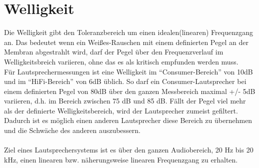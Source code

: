 \section{Welligkeit} \label{sec:8.6}
Die Welligkeit gibt den Toleranzbereich um einen idealen(linearen) Frequenzgang an.
Das bedeutet wenn ein Weißes-Rauschen mit einem definierten Pegel an der Membran abgestrahlt wird, darf der Pegel über den Frequenzverlauf im Welligkeitsbreich variieren, ohne das es als kritisch empfunden werden muss. \\
Für Lautsprechermessungen ist eine Welligkeit im \enquote{Consumer-Bereich} von 10dB und im \enquote{HiFi-Bereich} von 6dB üblich.
So darf ein Consumer-Lautsprecher bei einem definierten Pegel von 80dB über den ganzen Messbereich maximal +/- 5dB variieren, d.h. im Bereich zwischen 75 dB und 85 dB.
Fällt der Pegel viel mehr als der definierte Welligkeitsbereich, wird der Lautsprecher zumeist gefiltert.
Dadurch ist es möglich einen anderen Lautsprecher diese Bereich zu übernehmen und die Schwäche des anderen auszubessern.\\ \\
Ziel eines Lautsprechersystems ist es über den ganzen Audiobereich, 20 Hz bis 20 kHz, einen linearen bzw. näherungsweise linearen Frequenzgang zu erhalten.




